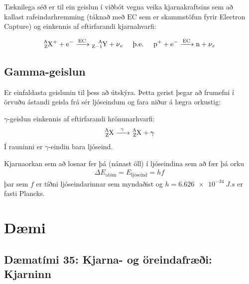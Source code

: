 Tæknilega séð er til ein geislun í viðbót vegna veika kjarnakraftsins sem að kallast rafeindarhremming (táknað með $\text{EC}$ sem er skammstöfun fyrir Electron Capture) og einkennis af eftirfarandi kjarnahvarfi:
\begin{tcolorbox}
\begin{align*}
\ce{^{A}_{Z}X+ + e^- ->[\text{EC}] ^{A}_{Z-1}Y + \nu_e } \hspace{0.5cm} \text{þ.e.} \hspace{0.5cm} \ce{p^+ + e^- ->[\text{EC}] n + \nu_e }
\end{align*}
\end{tcolorbox}






\subsection{Gamma-geislun}

Er einfaldasta geislunin til þess að útskýra. Þetta gerist þegar að frumefni í örvuðu ástandi geisla frá sér ljóseindum og fara niður á lægra orkustig:

\begin{tcolorbox}
\begin{definition}
$\gamma$-geislun einkennis af eftirfarandi hrönunarhvarfi:
\begin{align*}
    \ce{^{A}_{Z}X ->[\gamma] ^{A}_{Z}X + \gamma}
\end{align*}
Í rauninni er $\gamma$-eindin bara ljóseind.
\end{definition}
\end{tcolorbox}
Kjarnaorkan sem að losnar fer þá (nánast öll) í ljóseindina sem að fær þá orku
\begin{align*}
    \Delta E_{\text{atóm}} = E_{\text{ljóseind}} = hf
\end{align*}
þar sem $f$ er tíðni ljóseindarinnar sem myndaðist og $h = \SI{6.626e-34}{J.s}$ er fasti Plancks.

\newpage

\section{Dæmi}

\subsection*{Dæmatími 35: Kjarna- og öreindafræði: Kjarninn}

